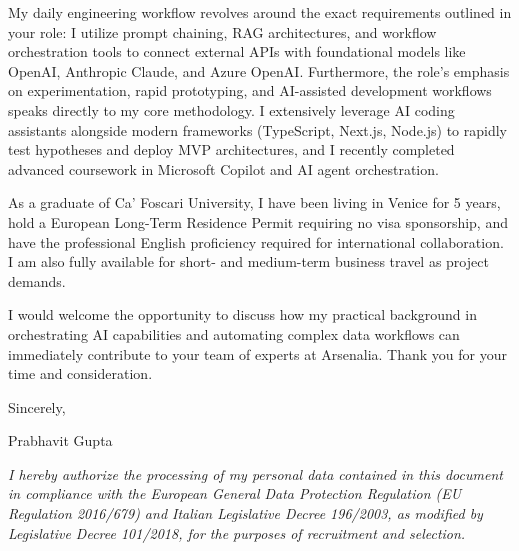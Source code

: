 \documentclass[10pt,a4paper]{article}
\begin{document}
My daily engineering workflow revolves around the exact requirements outlined in your role: I utilize prompt chaining, RAG architectures, and workflow orchestration tools to connect external APIs with foundational models like OpenAI, Anthropic Claude, and Azure OpenAI. Furthermore, the role's emphasis on experimentation, rapid prototyping, and AI-assisted development workflows speaks directly to my core methodology. I extensively leverage AI coding assistants alongside modern frameworks (TypeScript, Next.js, Node.js) to rapidly test hypotheses and deploy MVP architectures, and I recently completed advanced coursework in Microsoft Copilot and AI agent orchestration.

As a graduate of Ca' Foscari University, I have been living in Venice for 5 years, hold a European Long-Term Residence Permit requiring no visa sponsorship, and have the professional English proficiency required for international collaboration. I am also fully available for short- and medium-term business travel as project demands.

I would welcome the opportunity to discuss how my practical background in orchestrating AI capabilities and automating complex data workflows can immediately contribute to your team of experts at Arsenalia. Thank you for your time and consideration.

Sincerely,

Prabhavit Gupta

\vspace{1em}
\footnotesize
\textit{I hereby authorize the processing of my personal data contained in this document in compliance with the European General Data Protection Regulation (EU Regulation 2016/679) and Italian Legislative Decree 196/2003, as modified by Legislative Decree 101/2018, for the purposes of recruitment and selection.}
\end{document}

